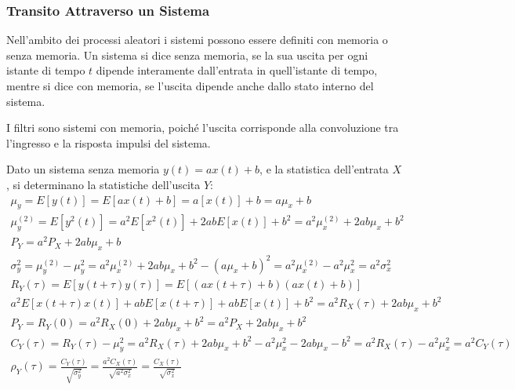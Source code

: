 \documentclass{article}
\numberwithin{equation}{subsection}
\begin{document}
\subsubsection{Transito Attraverso un Sistema}

Nell'ambito dei processi aleatori i sistemi possono essere definiti con memoria o senza memoria. Un sistema si dice senza memoria, se la sua uscita per ogni istante di 
tempo $t$ dipende interamente dall'entrata in quell'istante di tempo, mentre si dice con memoria, se l'uscita dipende anche dallo stato interno del sistema. 

I filtri sono sistemi con memoria, poiché l'uscita corrisponde alla convoluzione tra l'ingresso e la risposta impulsi del sistema. 

Dato un sistema senza memoria $y(t)=ax(t)+b$, e la statistica dell'entrata $X$, si determinano la statistiche dell'uscita $Y$:
\begin{gather*}
    \mu_y=E[y(t)]=E[ax(t)+b]=a[x(t)]+b=a\mu_x+b\\
    \mu_y^{(2)}=E[y^2(t)]=a^2E[x^2(t)]+2abE[x(t)]+b^2=a^2\mu_x^{(2)}+2ab\mu_x+b^2\\
    P_Y=a^2P_X+2ab\mu_x+b\\
    \sigma_y^2=\mu_y^{(2)}-\mu_y^2=a^2\mu_x^{(2)}+2ab\mu_x+b^2-(a\mu_x+b)^2=a^2\mu_x^{(2)}-a^2\mu_x^2=a^2\sigma_x^2\\
    R_Y(\tau)=E[y(t+\tau)y(\tau)]=E[(ax(t+\tau)+b)(ax(t)+b)]\\
    a^2E[x(t+\tau)x(t)]+abE[x(t+\tau)]+abE[x(t)]+b^2=a^2R_X(\tau)+2ab\mu_x+b^2\\
    P_Y=R_Y(0)=a^2R_X(0)+2ab\mu_x+b^2=a^2P_X+2ab\mu_x+b^2\\
    C_Y(\tau)=R_Y(\tau)-\mu_y^2=a^2R_X(\tau)+2ab\mu_x+b^2-a^2\mu_x^2-2ab\mu_x-b^2=a^2R_X(\tau)-a^2\mu_x^2=a^2C_Y(\tau)\\
    \rho_Y(\tau)=\displaystyle\frac{C_Y(\tau)}{\sqrt{\sigma_y^2}}=\frac{a^2C_X(\tau)}{\sqrt{a^2\sigma_x^2}}=\frac{C_X(\tau)}{\sqrt{\sigma_x^2}}
\end{gather*}
\end{document}
